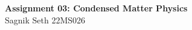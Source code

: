 \documentclass[usenames, svgnames, dvipsnames]{scrartcl}
\begin{document}
\begin{center}
    {\Large \textbf{\sffamily Assignment 03: Condensed Matter Physics }} \\[0.2cm]
   {\sffamily Sagnik Seth \hspace{0.4cm} 22MS026}\\[1cm]
\end{center}




\end{document}
